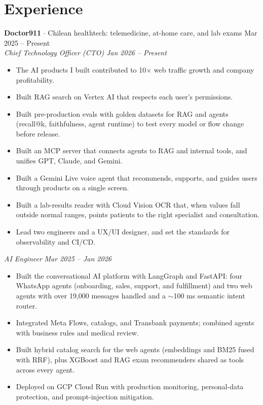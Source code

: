 \documentclass[a4paper,10pt]{article}
\begin{document}
\section*{Experience}
\textbf{Doctor911} $\cdot$ Chilean healthtech: telemedicine, at-home care, and lab exams \hfill Mar 2025 -- Present\\
\textit{Chief Technology Officer (CTO)} \hfill \textit{Jan 2026 -- Present}
\begin{itemize}
\item The AI products I built contributed to 10$\times$ web traffic growth and company profitability.
\item Built RAG search on Vertex AI that respects each user's permissions.
\item Built pre-production evals with golden datasets for RAG and agents (recall@k, faithfulness, agent runtime) to test every model or flow change before release.
\item Built an MCP server that connects agents to RAG and internal tools, and unifies GPT, Claude, and Gemini.
\item Built a Gemini Live voice agent that recommends, supports, and guides users through products on a single screen.
\item Built a lab-results reader with Cloud Vision OCR that, when values fall outside normal ranges, points patients to the right specialist and consultation.
\item Lead two engineers and a UX/UI designer, and set the standards for observability and CI/CD.
\end{itemize}
\textit{AI Engineer} \hfill \textit{Mar 2025 -- Jan 2026}
\begin{itemize}
\item Built the conversational AI platform with LangGraph and FastAPI: four WhatsApp agents (onboarding, sales, support, and fulfillment) and two web agents with over 19,000 messages handled and a $\sim$100 ms semantic intent router.
\item Integrated Meta Flows, catalogs, and Transbank payments; combined agents with business rules and medical review.
\item Built hybrid catalog search for the web agents (embeddings and BM25 fused with RRF), plus XGBoost and RAG exam recommenders shared as tools across every agent.
\item Deployed on GCP Cloud Run with production monitoring, personal-data protection, and prompt-injection mitigation.
\end{itemize}
\end{document}
